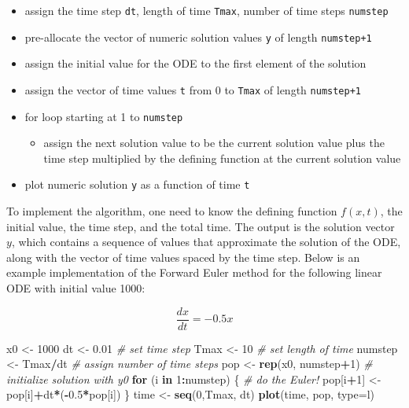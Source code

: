 \documentclass[
]{book}
\newenvironment{Shaded}{\begin{snugshade}}{\end{snugshade}}
\newcommand{\CommentTok}[1]{\textcolor[rgb]{0.56,0.35,0.01}{\textit{#1}}}
\newcommand{\ControlFlowTok}[1]{\textcolor[rgb]{0.13,0.29,0.53}{\textbf{#1}}}
\newcommand{\DataTypeTok}[1]{\textcolor[rgb]{0.13,0.29,0.53}{#1}}
\newcommand{\DecValTok}[1]{\textcolor[rgb]{0.00,0.00,0.81}{#1}}
\newcommand{\FloatTok}[1]{\textcolor[rgb]{0.00,0.00,0.81}{#1}}
\newcommand{\KeywordTok}[1]{\textcolor[rgb]{0.13,0.29,0.53}{\textbf{#1}}}
\newcommand{\NormalTok}[1]{#1}
\newcommand{\OperatorTok}[1]{\textcolor[rgb]{0.81,0.36,0.00}{\textbf{#1}}}
\newcommand{\StringTok}[1]{\textcolor[rgb]{0.31,0.60,0.02}{#1}}
\providecommand{\tightlist}{%
  \setlength{\itemsep}{0pt}\setlength{\parskip}{0pt}}
\theoremstyle{definition}
\theoremstyle{definition}
\theoremstyle{definition}
\theoremstyle{remark}
\begin{document}
\begin{itemize}
\item
  assign the time step \texttt{dt}, length of time \texttt{Tmax}, number of time steps \texttt{numstep}
\item
  pre-allocate the vector of numeric solution values \texttt{y} of length \texttt{numstep+1}
\item
  assign the initial value for the ODE to the first element of the solution
\item
  assign the vector of time values \texttt{t} from 0 to \texttt{Tmax} of length \texttt{numstep+1}
\item
  for loop starting at 1 to \texttt{numstep}

  \begin{itemize}
  \tightlist
  \item
    assign the next solution value to be the current solution value plus the time step multiplied by the defining function at the current solution value
  \end{itemize}
\item
  plot numeric solution \texttt{y} as a function of time \texttt{t}
\end{itemize}

To implement the algorithm, one need to know the defining function \(f(x,t)\), the initial value, the time step, and the total time. The output is the solution vector \(y\), which contains a sequence of values that approximate the solution of the ODE, along with the vector of time values spaced by the time step. Below is an example implementation of the Forward Euler method for the following linear ODE with initial value 1000:

\[ 
\frac{dx}{dt} =  -0.5 x 
\]

\begin{Shaded}
\begin{Highlighting}[]
\NormalTok{x0 \textless{}{-}}\StringTok{ }\DecValTok{1000}
\NormalTok{dt \textless{}{-}}\StringTok{ }\FloatTok{0.01} \CommentTok{\# set time step}
\NormalTok{Tmax \textless{}{-}}\StringTok{ }\DecValTok{10} \CommentTok{\# set length of time}
\NormalTok{numstep \textless{}{-}}\StringTok{ }\NormalTok{Tmax}\OperatorTok{/}\NormalTok{dt }\CommentTok{\# assign number of time steps}
\NormalTok{pop \textless{}{-}}\StringTok{ }\KeywordTok{rep}\NormalTok{(x0, numstep}\OperatorTok{+}\DecValTok{1}\NormalTok{) }\CommentTok{\# initialize solution with y0}
\ControlFlowTok{for}\NormalTok{ (i }\ControlFlowTok{in} \DecValTok{1}\OperatorTok{:}\NormalTok{numstep) \{ }\CommentTok{\# do the Euler!}
\NormalTok{    pop[i}\OperatorTok{+}\DecValTok{1}\NormalTok{] \textless{}{-}}\StringTok{ }\NormalTok{pop[i]}\OperatorTok{+}\NormalTok{dt}\OperatorTok{*}\NormalTok{(}\OperatorTok{{-}}\FloatTok{0.5}\OperatorTok{*}\NormalTok{pop[i])}
\NormalTok{\}}
\NormalTok{time \textless{}{-}}\StringTok{ }\KeywordTok{seq}\NormalTok{(}\DecValTok{0}\NormalTok{,Tmax, dt)}
\KeywordTok{plot}\NormalTok{(time, pop, }\DataTypeTok{type=}\StringTok{\textquotesingle{}l\textquotesingle{}}\NormalTok{)}
\end{Highlighting}
\end{Shaded}
\end{document}
